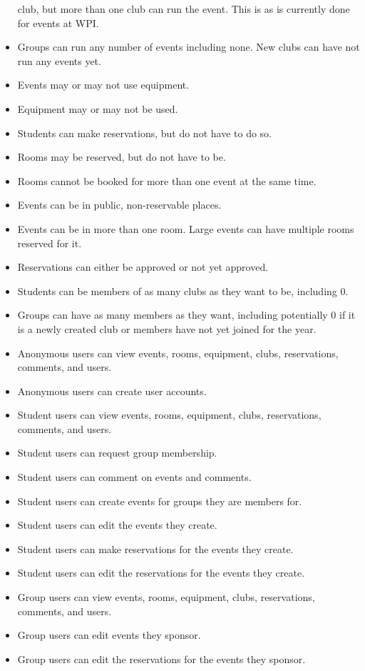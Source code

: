 \documentclass{article}
\begin{document}
\begin{itemize}
club, but more than one club can run the event. This is as is currently done for
events at WPI.  
\item Groups can run any number of events including none. New clubs can have not
run any events yet. 
\item Events may or may not use equipment.
\item Equipment may or may not be used.
\item Students can make reservations, but do not have to do so.
\item Rooms may be reserved, but do not have to be.
\item Rooms cannot be booked for more than one event at the same time. 
\item Events can be in public, non-reservable places.
\item Events can be in more than one room. Large events can have multiple rooms
reserved for it.
\item Reservations can either be approved or not yet approved.
\item Students can be members of as many clubs as they want to be, including 0.
\item Groups can have as many members as they want, including potentially 0 if
it is a newly created club or members have not yet joined for the year.
\item Anonymous users can view events, rooms, equipment, clubs, reservations, comments, and users.
\item Anonymous users can create user accounts.
\item Student users can view events, rooms, equipment, clubs, reservations, comments, and users.
\item Student users can request group membership.
\item Student users can comment on events and comments.
\item Student users can create events for groups they are members for.
\item Student users can edit the events they create.
\item Student users can make reservations for the events they create.
\item Student users can edit the reservations for the events they create.
\item Group users can view events, rooms, equipment, clubs, reservations, comments, and users.
\item Group users can edit events they sponsor.
\item Group users can edit the reservations for the events they sponsor.

\end{itemize}
\end{document}
